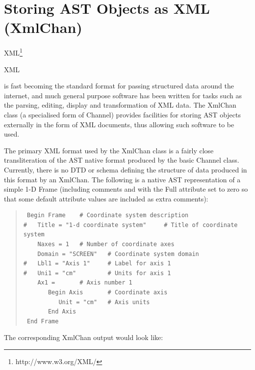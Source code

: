 \documentclass[twoside,11pt]{article}
\newcommand{\htmladdnormallink}[2]{#1}
\newenvironment{latexonly}{}{}
\begin{document}
\cleardoublepage
\section{\label{ss:xmlchan}Storing AST Objects as XML (XmlChan)}

\begin{latexonly}
XML\footnote{http://www.w3.org/XML/}
\end{latexonly}
\begin{htmlonly}
\htmladdnormallink{XML}{http://www.w3.org/XML/}
\end{htmlonly}
is fast becoming the standard format for passing structured data around
the internet, and much general purpose software has been written for
tasks such as the parsing, editing, display and transformation of XML
data. The XmlChan class (a specialised form of Channel) provides
facilities for storing AST objects externally in the form of XML documents,
thus allowing such software to be used.

The primary XML format used by the XmlChan class is a fairly close
transliteration of the AST native format produced by the basic Channel
class. Currently, there is no DTD or schema defining the structure of data
produced in this format by an XmlChan. The following is a native AST
representation of a simple 1-D Frame (including comments and with the Full
attribute set to zero so that some default attribute values are included
as extra comments):

\begin{quote}
\small
\begin{verbatim}
 Begin Frame    # Coordinate system description
#   Title = "1-d coordinate system"     # Title of coordinate system
    Naxes = 1   # Number of coordinate axes
    Domain = "SCREEN"   # Coordinate system domain
#   Lbl1 = "Axis 1"     # Label for axis 1
#   Uni1 = "cm"         # Units for axis 1
    Ax1 =       # Axis number 1
       Begin Axis       # Coordinate axis
          Unit = "cm"   # Axis units
       End Axis
 End Frame
\end{verbatim}
\normalsize
\end{quote}

The corresponding XmlChan output would look like:
\end{document}
